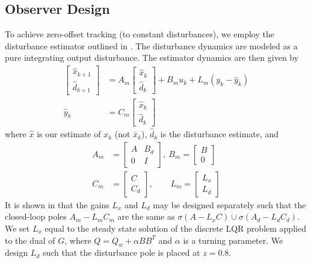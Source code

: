 \documentclass[twocolumn,twoside]{IEEEtran}
\newcommand{\x}{\ensuremath{x }\xspace}
\begin{document}
\subsection{Observer Design}\label{sec:dist_est}
To achieve zero-offset tracking (to constant disturbances), we employ the disturbance estimator outlined in \cite{maeder_offset-free_2007}. The disturbance dynamics are modeled as a pure integrating output disturbance. The estimator dynamics are then given by
\begin{align}
  \begin{bmatrix} \hat{\x}_{k+1}\\ \hat{d}_{k+1} \end{bmatrix}
  &= A_m
  \begin{bmatrix} \hat{\x}_{k}\\ \hat{d}_k\end{bmatrix}
    + B_m u_k + L_m(y_k - \hat y_k) \label{eqn:obsdyn}\\
  \hat y_k &= C_m\begin{bmatrix} \hat{\x}_k\label{eqn:yhat}\\
    \hat{d}_k \end{bmatrix}
\end{align}
where $\hat{x}$ is our estimate of $x_k$ (not $\bar{x}_k$), $\hat{d}_k$ is the disturbance estimate, and 
\begin{align}
  A_m& = \begin{bmatrix}
    A & B_d \\ 0 & I
  \end{bmatrix},\:
  B_m =
  \begin{bmatrix}
    B \\ 0
  \end{bmatrix} \\
  C_m &= 
    \begin{bmatrix}
    C \\ C_d
  \end{bmatrix},\:\:\:\:\:\:\:\:\;
  L_m = \begin{bmatrix} L_x\\L_d \end{bmatrix} \label{eqn:CmLm}
\end{align}
It is shown in \cite{maeder_offset-free_2007} that the gains $L_x$ and $L_d$ may be designed separately such that the closed-loop poles $A_m - L_mC_m$ are the same as $\sigma(A-L_xC)\cup \sigma(A_d-L_dC_d)$.
We set $L_x$ equal to the steady state solution of the discrete LQR problem applied to the dual of $G$, where $Q = Q_w + \alpha BB^T$ and $\alpha$ is a turning parameter. We design $L_d$ such that the disturbance pole is placed at $z=0.8$.
\end{document}

